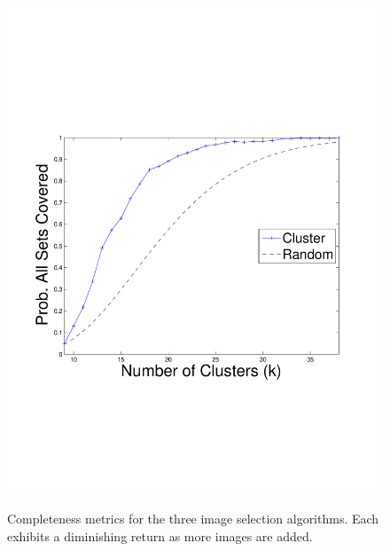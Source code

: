 \begin{figure}[t!]
{        \includegraphics[clip=true, trim = 16mm 65mm 25mm 70mm, scale=0.23]{figures/cluster/perc_all_sets_covered_vary_k_color.pdf}
        \label{fig:clusterAvgNumSetsCov}
        }        
   \caption{Completeness metrics for the three image selection algorithms. Each exhibits a diminishing return as more images are added.}
   \label{fig:completeness_exp_results}
   \vspace{-4mm}
\end{figure}